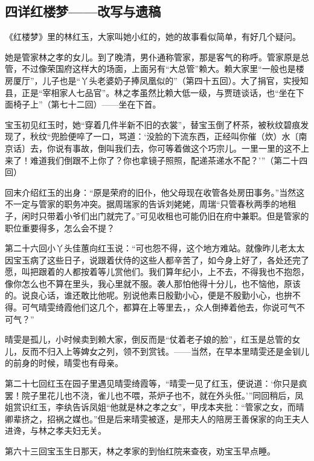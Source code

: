 \subsection{四详红楼梦——改写与遗稿}


\par 《红楼梦》里的林红玉，大家叫她小红的，她的故事看似简单，有好几个疑问。
\par 她是管家林之孝的女儿。到了晚清，男仆通称管家，那是客气的称呼。管家原是总管，不过像荣国府这样大的场面，上面另有“大总管”赖大。赖大家里“一般也是楼房厦厅”，儿子也是“丫头老婆奶子捧凤凰似的”（第四十五回）。大了捐官，实授知县，正是“宰相家人七品官”。林之孝虽然比赖大低一级，与贾琏谈话，也“坐在下面椅子上”（第七十二回）——坐在下首。
\par 宝玉初见红玉时，她“穿着几件半新不旧的衣裳”，替宝玉倒了杯茶，被秋纹碧痕发现了，秋纹“兜脸便啐了一口，骂道：‘没脸的下流东西，正经叫你催（炊）水〔南京话〕去，你说有事故，倒叫我们去，你可等着做这个巧宗儿。一里一里的这不上来了！难道我们倒跟不上你了？你也拿镜子照照，配递茶递水不配？'”（第二十四回）
\par 回末介绍红玉的出身：“原是荣府的旧仆，他父母现在收管各处房田事务。”当然这不一定与管家的职务冲突。据周瑞家的告诉刘姥姥，周瑞“只管春秋两季的地租子，闲时只带着小爷们出门就完了。”可见收租也可能仍旧在府中兼职。但是管家的职位重要得多，怎么会不提？
\par 第二十六回小丫头佳蕙向红玉说：“可也怨不得，这个地方难站。就像昨儿老太太因宝玉病了这些日子，说跟着伏侍的这些人都辛苦了，如今身上好了，各处还完了愿，叫把跟着的人都按着等儿赏他们。我们算年纪小，上不去，不得我也不抱怨，像你怎么也不算在里头，我心里就不服。袭人那怕他得十分儿，也不恼他，原该的。说良心话，谁还敢比他呢。别说他素日殷勤小心，便是不殷勤小心，也拚不得。可气晴雯绮霞他们这几个，都算在上等里去，，众人倒捧着他去，你说可气不可气？”
\par 晴雯是孤儿，小时候卖到赖大家，倒反而是“仗着老子娘的脸”，红玉是总管的女儿，反而不归入上等婢女之列，领不到赏钱。——当然，在早本里晴雯还是金钏儿的前身的时候，晴雯也有母亲。
\par 第二十七回红玉在园子里遇见晴雯绮霞等，“晴雯一见了红玉，便说道：‘你只是疯罢！院子里花儿也不浇，雀儿也不喂，茶炉子也不，就在外头俇。'”同回稍后，凤姐赏识红玉，李纨告诉凤姐“他就是林之孝之女”，甲戌本夹批：“管家之女，而晴卿辈挤之，招祸之媒也。”但是后来晴雯被逐，是邢夫人的陪房王善保家的向王夫人进谗，与林之孝夫妇无关。
\par 第六十三回宝玉生日那天，林之孝家的到怡红院来查夜，劝宝玉早点睡。
